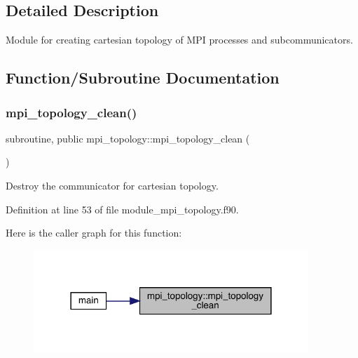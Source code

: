 \subsection{Detailed Description}
Module for creating cartesian topology of M\+PI processes and subcommunicators. 

\subsection{Function/\+Subroutine Documentation}
\mbox{\label{namespacempi__topology_aa14e91baaec6d1c1082ebd5ac6e19128}} 
\subsubsection{\texorpdfstring{mpi\_topology\_clean()}{mpi\_topology\_clean()}}
{\footnotesize\ttfamily subroutine, public mpi\+\_\+topology\+::mpi\+\_\+topology\+\_\+clean (\begin{DoxyParamCaption}{ }\end{DoxyParamCaption})}



Destroy the communicator for cartesian topology. 



Definition at line 53 of file module\+\_\+mpi\+\_\+topology.\+f90.

Here is the caller graph for this function\+:
\nopagebreak
\begin{figure}[H]
\begin{center}
\leavevmode
\includegraphics[width=294pt]{namespacempi__topology_aa14e91baaec6d1c1082ebd5ac6e19128_icgraph}
\end{center}
\end{figure}
\mbox{\label{namespacempi__topology_a8819f16f50aded913f17520a29d3ec4c}} 

